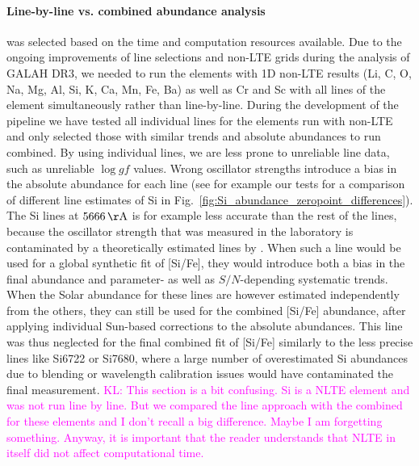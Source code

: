 \documentclass[fleqn,usenatbib,useAMS]{mnras}
\newcommand\KL[1]{\textcolor{magenta}{KL: #1}}
\begin{document}
\paragraph*{Line-by-line vs. combined abundance analysis} was selected based on the time and computation resources available. Due to the ongoing improvements of line selections and non-LTE grids during the analysis of GALAH DR3, we needed to run the elements with 1D non-LTE results (Li, C, O, Na, Mg, Al, Si, K, Ca, Mn, Fe, Ba) as well as Cr and Sc with all lines of the element simultaneously rather than line-by-line. During the development of the pipeline we have tested all individual lines for the elements run with non-LTE and only selected those with similar trends and absolute abundances to run combined. By using individual lines, we are less prone to unreliable line data, such as unreliable $\log gf$ values. Wrong oscillator strengths introduce a bias in the absolute abundance for each line (see for example our tests for a comparison of different line estimates of Si in Fig.~\ref{fig:Si_abundance_zeropoint_differences}). The Si lines at $5666\,\mathrm{\AA}$ is for example less accurate than the rest of the lines, because the oscillator strength that was measured in the laboratory \citep{GARZ,BL} is contaminated by a theoretically estimated lines by \citet{K07}. When such a line would be used for a global synthetic fit of [Si/Fe], they would introduce both a bias in the final abundance and parameter- as well as $S/N$-depending systematic trends. When the Solar abundance for these lines are however estimated independently from the others, they can still be used for the combined [Si/Fe] abundance, after applying individual Sun-based corrections to the absolute abundances. This line was thus neglected for the final combined fit of [Si/Fe] similarly to the less precise lines like Si6722 or Si7680, where a large number of overestimated Si abundances due to blending or wavelength calibration issues would have contaminated the final measurement. \KL{This section is a bit confusing. Si is a NLTE element and was not run line by line. But we compared the line approach with the combined for these elements and I don't recall a big difference. Maybe I am forgetting something. Anyway, it is important that the reader understands that NLTE in itself did not affect computational time. }
\end{document}
